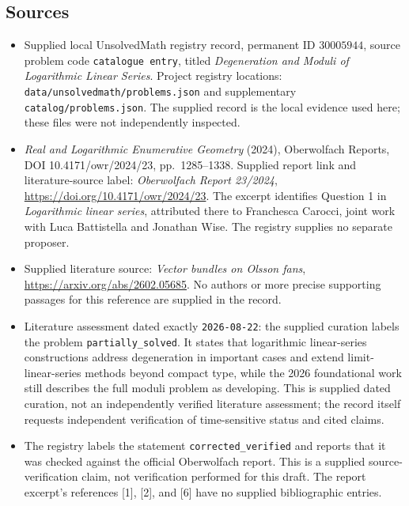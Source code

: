 \documentclass[11pt]{article}
\begin{document}
\subsection{Sources}
\begin{itemize}
\item Supplied local UnsolvedMath registry record, permanent ID \(30005944\), source problem code \texttt{catalogue entry}, titled \emph{Degeneration and Moduli of Logarithmic Linear Series}. Project registry locations: \texttt{data/unsolvedmath/problems.json} and supplementary \texttt{catalog/problems.json}. The supplied record is the local evidence used here; these files were not independently inspected.
\item \emph{Real and Logarithmic Enumerative Geometry} (2024), Oberwolfach Reports, DOI 10.4171/owr/2024/23, pp.\ 1285--1338. Supplied report link and literature-source label: \emph{Oberwolfach Report 23/2024}, \url{https://doi.org/10.4171/owr/2024/23}. The excerpt identifies Question 1 in \emph{Logarithmic linear series}, attributed there to Franchesca Carocci, joint work with Luca Battistella and Jonathan Wise. The registry supplies no separate proposer.
\item Supplied literature source: \emph{Vector bundles on Olsson fans}, \url{https://arxiv.org/abs/2602.05685}. No authors or more precise supporting passages for this reference are supplied in the record.
\item Literature assessment dated exactly \texttt{2026-08-22}: the supplied curation labels the problem \texttt{partially\_solved}. It states that logarithmic linear-series constructions address degeneration in important cases and extend limit-linear-series methods beyond compact type, while the 2026 foundational work still describes the full moduli problem as developing. This is supplied dated curation, not an independently verified literature assessment; the record itself requests independent verification of time-sensitive status and cited claims.
\item The registry labels the statement \texttt{corrected\_verified} and reports that it was checked against the official Oberwolfach report. This is a supplied source-verification claim, not verification performed for this draft. The report excerpt's references [1], [2], and [6] have no supplied bibliographic entries.
\end{itemize}
\end{document}
